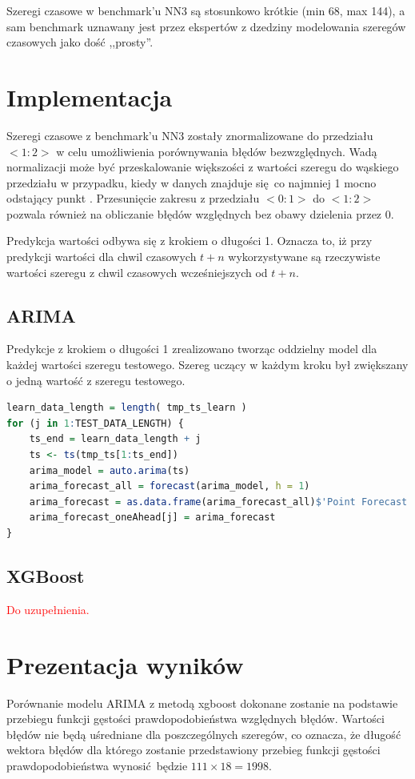 \documentclass[11pt]{report}
\begin{document}
Szeregi czasowe w benchmark'u NN3 są stosunkowo krótkie (min 68, max 144), a sam benchmark uznawany jest przez ekspertów z dzedziny modelowania szeregów czasowych jako dość ,,prosty''.

\section{Implementacja}

Szeregi czasowe z benchmark'u NN3 zostały znormalizowane do przedziału $<1:2>$ w celu umożliwienia porównywania błędów bezwzględnych.
Wadą normalizacji może być przeskalowanie większości z wartości szeregu do wąskiego przedziału w przypadku, kiedy w danych znajduje się co najmniej 1 mocno odstający punkt \cite{noauthor_standardization_nodate}.
Przesunięcie zakresu z przedziału $<0:1>$ do $<1:2>$ pozwala również na obliczanie błędów względnych bez obawy dzielenia przez 0.

Predykcja wartości odbywa się z krokiem o długości 1.
Oznacza to, iż przy predykcji wartości dla chwil czasowych $t+n$ wykorzystywane są rzeczywiste wartości szeregu z chwil czasowych wcześniejszych od $t+n$.

\subsection{ARIMA}
Predykcje z krokiem o długości 1 zrealizowano tworząc oddzielny model dla każdej wartości szeregu testowego. Szereg uczący w każdym kroku był zwiększany o jedną wartość z szeregu testowego.
\begin{lstlisting}[language=R]
learn_data_length = length( tmp_ts_learn )
for (j in 1:TEST_DATA_LENGTH) {
    ts_end = learn_data_length + j
    ts <- ts(tmp_ts[1:ts_end])
    arima_model = auto.arima(ts)
    arima_forecast_all = forecast(arima_model, h = 1)
    arima_forecast = as.data.frame(arima_forecast_all)$'Point Forecast'
    arima_forecast_oneAhead[j] = arima_forecast
}
\end{lstlisting}

\subsection{XGBoost}
\textcolor{red}{Do uzupełnienia.}

\section{Prezentacja wyników}
\color{red}
Porównanie modelu ARIMA z metodą xgboost dokonane zostanie na podstawie przebiegu funkcji gęstości prawdopodobieństwa względnych błędów.
Wartości błędów nie będą uśredniane dla poszczególnych szeregów, co oznacza, że długość wektora błędów dla którego zostanie przedstawiony przebieg funkcji gęstości prawdopodobieństwa wynosić będzie $111 \times 18 = 1998$.
\end{document}
